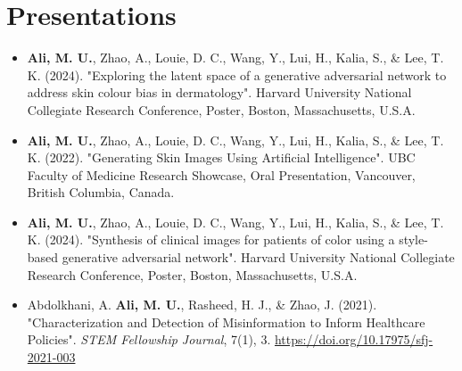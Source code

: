 
\section{Presentations}

\begin{itemize}[leftmargin=0.15in, label={}]
    \item{\textbf{Ali, M. U.}, Zhao, A., Louie, D. C., Wang, Y., Lui, H., Kalia, S., \& Lee, T. K. (2024). "Exploring the latent space of a generative adversarial network to address skin colour bias in dermatology". Harvard University National Collegiate Research Conference, Poster, Boston, Massachusetts, U.S.A.}

    
    \item{\textbf{Ali, M. U.}, Zhao, A., Louie, D. C., Wang, Y., Lui, H., Kalia, S., \& Lee, T. K. (2022). "Generating Skin Images Using Artificial Intelligence". UBC Faculty of Medicine Research Showcase, Oral Presentation, Vancouver, British Columbia, Canada.}

    
    \item{\textbf{Ali, M. U.}, Zhao, A., Louie, D. C., Wang, Y., Lui, H., Kalia, S., \& Lee, T. K. (2024). "Synthesis of clinical images for patients of color using a style-based generative adversarial network". Harvard University National Collegiate Research Conference, Poster, Boston, Massachusetts, U.S.A.}
    
    \item{Abdolkhani, A. \textbf{Ali, M. U.}, Rasheed, H. J., \& Zhao, J. (2021). "Characterization and Detection of Misinformation to Inform Healthcare Policies". \textit{STEM Fellowship Journal}, 7(1), 3. \url{https://doi.org/10.17975/sfj-2021-003}}
\end{itemize}
    



